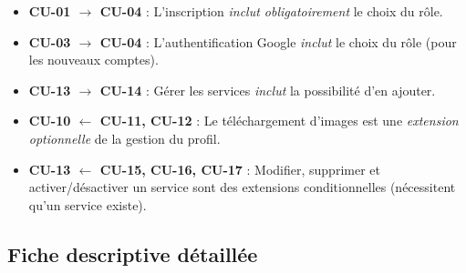 \documentclass[12pt,a4paper]{article}
\begin{document}
\begin{itemize}[leftmargin=2cm]
    \item[\texttt{«include»}] \textbf{CU-01 $\rightarrow$ CU-04} : L'inscription \textit{inclut obligatoirement} le choix du rôle.
    \item[\texttt{«include»}] \textbf{CU-03 $\rightarrow$ CU-04} : L'authentification Google \textit{inclut} le choix du rôle (pour les nouveaux comptes).
    \item[\texttt{«include»}] \textbf{CU-13 $\rightarrow$ CU-14} : Gérer les services \textit{inclut} la possibilité d'en ajouter.
    \item[\texttt{«extend»}] \textbf{CU-10 $\leftarrow$ CU-11, CU-12} : Le téléchargement d'images est une \textit{extension optionnelle} de la gestion du profil.
    \item[\texttt{«extend»}] \textbf{CU-13 $\leftarrow$ CU-15, CU-16, CU-17} : Modifier, supprimer et activer/désactiver un service sont des extensions conditionnelles (nécessitent qu'un service existe).
\end{itemize}

\subsection{Fiche descriptive détaillée}
\end{document}
